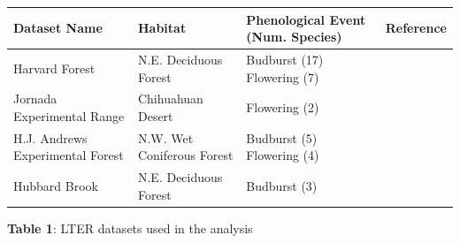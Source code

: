 \documentclass[fleqn,12pt,lineno]{article}
\begin{document}






\newpage

\begin{adjustbox}{angle=90}
    \begin{tabular}{ | l | l | l | l |}
    \hline
    Dataset Name & Habitat &  Phenological Event (Num. Species) & Reference \\ \hline
    Harvard Forest & N.E. Deciduous Forest & Budburst (17) Flowering (7) & \citep{okeefe2015} \\
    Jornada Experimental Range & Chihuahuan Desert & Flowering (2) &  \\
    H.J. Andrews Experimental Forest & N.W. Wet Coniferous Forest & Budburst (5) Flowering (4) & \citep{schulze2017} \\
    Hubbard Brook & N.E. Deciduous Forest & Budburst (3) & \citep{bailey2018} \\
    \hline
    \end{tabular}
\end{adjustbox} \newline
\textbf{Table 1}: LTER datasets used in the analysis




\end{document}
